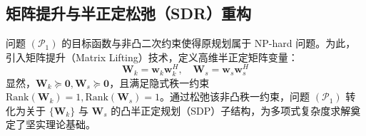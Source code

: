 \subsection{矩阵提升与半正定松弛（SDR）重构}
问题 $(\mathcal{P}_1)$ 的目标函数与非凸二次约束使得原规划属于 NP-hard 问题。为此，引入矩阵提升（Matrix Lifting）技术，定义高维半正定矩阵变量：
\begin{equation}
  \mathbf{W}_k = \mathbf{w}_k \mathbf{w}_k^H, \quad \mathbf{W}_s = \mathbf{w}_s \mathbf{w}_s^H
\end{equation}
显然，$\mathbf{W}_k \succeq \mathbf{0}, \mathbf{W}_s \succeq \mathbf{0}$，且满足隐式秩一约束 $\mathrm{Rank}(\mathbf{W}_k) = 1, \mathrm{Rank}(\mathbf{W}_s) = 1$。通过松弛该非凸秩一约束，问题 $(\mathcal{P}_1)$ 转化为关于 $\{\mathbf{W}_k\}$ 与 $\mathbf{W}_s$ 的凸半正定规划（SDP）子结构，为多项式复杂度求解奠定了坚实理论基础。
